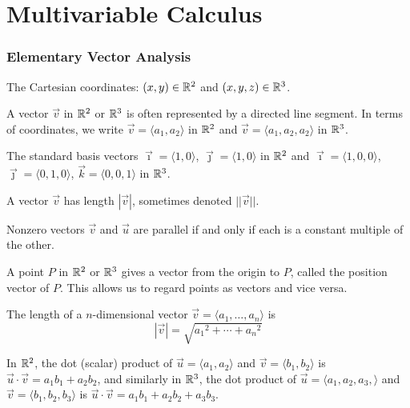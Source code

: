 \part*{Multivariable Calculus}

\section*{Elementary Vector Analysis}

\begin{notation}
	The Cartesian coordinates: $(x, y) \in {\mathbb{R}}^2$ and $(x, y, z) \in {\mathbb{R}}^3$.
\end{notation}

\begin{notation}
	A vector $\vec{v}$ in ${\mathbb{R}}^2$ or ${\mathbb{R}}^3$ is often represented by a directed line
	segment. In terms of coordinates, we write $\vec{v} = \langle a_1, a_2
	\rangle$ in ${\mathbb{R}}^2$ and $\vec{v} = \langle a_1, a_2, a_2 \rangle$ in ${\mathbb{R}}^3$.
\end{notation}

\begin{notation}
	The standard basis vectors $\vec{\imath} = \langle 1, 0 \rangle$,
	$\vec{\jmath} = \langle 1, 0 \rangle$ in ${\mathbb{R}}^2$ and $\vec{\imath} = \langle 1,
	0, 0 \rangle$, $\vec{\jmath} = \langle 0, 1, 0 \rangle$, $\vec{k} = \langle 0,
	0, 1 \rangle$ in ${\mathbb{R}}^3$.
\end{notation}

\begin{notation}
	A vector $\vec{v}$ has length $|\vec{v}|$, sometimes denoted $||\vec{v}||$.
\end{notation}

\begin{fact}
	Nonzero vectors $\vec{v}$ and $\vec{u}$ are parallel if and only if each is a
	constant multiple of the other.
\end{fact}

\begin{definition}
	A point $P$ in ${\mathbb{R}}^2$ or ${\mathbb{R}}^3$ gives a vector from the origin to $P$, called
	the position vector of $P$. This allows us to regard points as vectors and
	vice versa.
\end{definition}

\begin{definition}
	The length of a $n$-dimensional vector $\vec{v} = \langle a_1, \dots, a_n
	\rangle$ is
	\[
		|\vec{v}| = \sqrt{{a_1}^2 + \cdots + {a_n}^2}
	\]
\end{definition}

\begin{definition}
	In ${\mathbb{R}}^2$, the dot (scalar) product of $\vec{u} = \langle a_1, a_2 \rangle$
	and $\vec{v} = \langle b_1, b_2 \rangle$ is $\vec{u} \cdot \vec{v} = a_1 b_1 +
	a_2 b_2$, and similarly in ${\mathbb{R}}^3$, the dot product of $\vec{u} = \langle a_1,
	a_2, a_3, \rangle$ and $\vec{v} = \langle b_1, b_2, b_3 \rangle$ is $\vec{u}
	\cdot \vec{v} = a_1 b_1 + a_2 b_2 + a_3 b_3$.
\end{definition}

